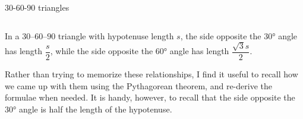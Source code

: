 \documentclass[9pt,aspectratio=169]{beamer}
\begin{document}
\begin{frame}{30-60-90 triangles}
\begin{columns}[T]
\begin{column}{0.5\textwidth}
      \begin{definition}
        In a $30\mbox{--}60\mbox{--}90$ triangle with hypotenuse length $s$, the side opposite the $30°$ angle has length $\dfrac{s}{2}$, while the side opposite the $60°$ angle has length $\dfrac{\sqrt{3}s}{2}$.
      \end{definition}

      Rather than trying to memorize these relationships, I find it useful to recall how we came up with them using the Pythagorean theorem, and re-derive the formulae when needed.  It is handy, however, to recall that the side opposite the $30°$ angle is half the length of the hypotenuse.
    \end{column}
  \end{columns}
\end{frame}
\end{document}

